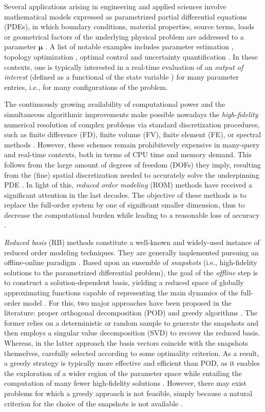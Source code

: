 \documentclass{elsarticle}
\numberwithin{equation}{section}
\theoremstyle{theorem}
\theoremstyle{definition}
\theoremstyle{remark}
\theoremstyle{proposition}
\numberwithin{figure}{section}
\newcommand{\bg}[1]{\boldsymbol{#1}}
\begin{document}
		Several applications arising in engineering and applied sciences involve mathematical models expressed as parametrized partial differential equations (PDEs), in which boundary conditions, material properties, source terms, loads or geometrical factors of the underlying physical problem are addressed to a parameter $\bg{\mu}$ \cite{Eft08, HSR16, JIR14}. A list of notable examples includes parameter estimation \cite{Bro93}, topology optimization \cite{Ben04}, optimal control \cite{LM67} and uncertainty quantification \cite{LeM10}. In these contexts, one is typically interested in a real-time evaluation of an \emph{output of interest} (defined as a functional of the state variable \cite{Dep08}) for many parameter entries, i.e., for many configurations of the problem.  
		
		The continuously growing availability of computational power and the simultaneous algorithmic improvements make possible nowadays the \emph{high-fidelity} numerical resolution of complex problems via standard discretization procedures, such as finite difference (FD), finite volume (FV), finite element (FE), or spectral methods \cite{QMN15}. However, these schemes remain prohibitevely expensive in many-query and real-time contexts, both in terms of CPU time and memory demand. This follows from the large amount of degrees of freedom (DOFs) they imply, resulting from the (fine) spatial discretization needed to accurately solve the underpinning PDE \cite{Ams10}. In light of this, \emph{reduced order modeling} (ROM) methods have received a significant attention in the last decades. The objective of these methods is to replace the full-order system by one of significant smaller dimension, thus to decrease the computational burden while leading to a reasonable loss of accuracy \cite{Chen17}. 
		
		\emph{Reduced basis} (RB) methods constitute a well-known and widely-used instance of reduced order modeling techniques. They are generally implemented pursuing an offline-online paradigm \cite{Mad06}. Based upon an ensemble of \emph{snapshots} (i.e., high-fidelity solutions to the parametrized differential problem), the goal of the \emph{offline} step is to construct a solution-dependent basis, yielding a reduced space of globally approximating functions capable of representing the main dynamics of the full-order model \cite{Bal14, Chen17}. For this, two major approaches have been proposed in the literature: proper orthogonal decomposition (POD) \cite{Lia02, Vol08} and greedy algorithms \cite{HSZ14}. The former relies on a deterministic or random sample to generate the snapshots and then employs a singular value decomposition (SVD) to recover the reduced basis. Whereas, in the latter approach the basis vectors coincide with the snapshots themselves, carefully selected according to some optimality criterion. As a result, a greedy strategy is typically more effective and efficient than POD, as it enables the exploration of a wider region of the parameter space while entailing the computation of many fewer high-fidelity solutions \cite{HSR16}. However, there may exist problems for which a greedy approach is not feasible, simply because a natural criterion for the choice of the snapshots is not available \cite{Bal14}.
		
\end{document}
